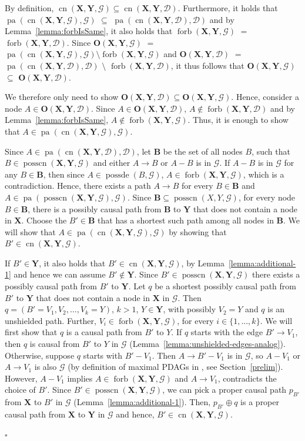 \documentclass[11pt,a4paper]{article}
\theoremstyle{definition}
\theoremstyle{remark}
\newenvironment{proofof}[1][]{\begin{trivlist}
\item[\hskip \labelsep {\textit{Proof of #1.}}]}{\hfill{}$\square$\end{trivlist}}
\DeclareMathOperator{\Forbb}{forb}
\DeclareMathOperator{\pa}{pa}
\DeclareMathOperator{\possde}{possde}
\DeclareMathOperator{\CN}{cn}
\DeclareMathOperator{\possCN}{posscn}
\newcommand{\mpdag}{maximal PDAG}
\newcommand{\g}[1][G]{\mathcal{#1}}
\newcommand{\fb}[2][X,Y]{\Forbb(\mathbf{#1},#2)}
\newcommand{\cnb}[2][X,Y]{\CN(\mathbf{#1},#2)}
\newcommand{\posscn}[2][X,Y]{\possCN(#1,#2)}
\newcommand{\posscnb}[2][X,Y]{\possCN(\mathbf{#1},#2)}
\newcommand{\optb}[2][X,Y]{\mathbf{O}(\mathbf{#1},#2)}
\begin{document}
\begin{proofof}[Lemma~\ref{lemma:optimalSetEquiv}] %
	By definition, $\cnb{\g} \subseteq \cnb{\g[D]}$. Furthermore, it holds that $\pa(\cnb{\g},\g)$ $\subseteq$ $ \pa(\cnb{\g[D]},\g[D])$ and by Lemma~\ref{lemma:forbIsSame}, it also holds that $\fb{\g}$ $=$ $\fb{\g[D]}$. Since $\optb{\g}$ $=$ $\pa(\cnb{\g},\g)\setminus \fb{\g}$ and $\optb{\g[D]}$ $=$ $\pa(\cnb{\g[D]},\g[D])$ $\setminus$ $\fb{\g[D]}$, it thus follows that $\optb{\g}$ $\subseteq$ $\optb{\g[D]}$.
	
	We therefore only need to show $\optb{\g[D]} \subseteq \optb{\g}$. Hence, consider a node $A \in \optb{\g[D]}$. Since $A \in \optb{\g[D]}$, $A \notin \fb{\g[D]}$ and by Lemma~\ref{lemma:forbIsSame}, $A \notin \fb{\g}$. Thus, it is enough to show that $A \in \pa(\cnb{\g},\g)$.
	
	Since $A \in \pa(\cnb{\g[D]},\g[D])$, let $\mathbf{B}$ be the set of all nodes $B $, such that $B \in \posscnb{\g}$ and either $A \rightarrow B$ or $A-B$ is in $\g$. If $A-B$ is in $\g$ for any $B \in \mathbf{B}$, then since $A \in \possde(B,\g)$, $A \in \fb{\g}$, which is a contradiction. Hence, there exists a path $A \rightarrow B$ for every $B \in \mathbf{B}$ and $A \in \pa(\posscnb{\g},\g)$.
	Since $\mathbf{B} \subseteq \posscn{\g}$, for every node $B \in \mathbf{B}$, there is a possibly causal path from $\mathbf{B}$ to $\mathbf{Y}$ that does not contain a node in $\mathbf{X}$. Choose  the $B' \in \mathbf{B}$ that has a shortest such path among all nodes in $\mathbf{B}$. 
	We will show that $A \in \pa(\cnb{\g},\g)$ by showing that $B' \in \cnb{\g}$.
	
	If $B' \in \mathbf{Y}$,  it also holds that $B' \in \cnb{\g}$, by Lemma~\ref{lemma:additional-1} and hence we can assume $B' \notin \mathbf{Y}$. Since $B' \in \posscnb{\g}$ there exists a possibly causal path from $B'$ to $\mathbf{Y}$. Let $q$ be a shortest possibly causal path from $B'$ to $\mathbf{Y}$ that does not contain a node in $\mathbf{X}$ in $\g$. Then $q = ( B' =V_1, V_2,\dots, V_k=Y)$, $k >1$, $Y\in \mathbf{Y}$, with possibly $V_2 =Y$ and $q$ is an unshielded path. Further, $V_i \in \fb{\g}$, for every $i \in \{1,\dots,k\}$. 
	We will first show that $q$ is a causal path from $B'$ to $Y$.
	If $q$ starts with the edge $B' \rightarrow V_1$, then $q$ is causal from $B'$ to $Y$ in $\g$ (Lemma~\ref{lemma:unshielded-edges-analog}).  Otherwise, suppose $q$ starts with $B' - V_1$. Then $A \rightarrow B' -V_1$ is in $\g$, so $A -V_1$ or $A \rightarrow V_1$ is also $\g$ (by definition of \mpdag{}s in \citet{meek1995causal}, see Section~\ref{prelim}).
	However, $A - V_1$ implies $A \in \fb{\g}$ and $A \rightarrow V_1$, contradicts the choice of $B'$. 
	Since $B' \in \posscnb{\g}$, we can pick a proper causal path $p_{B'}$ from $\mathbf{X}$ to $B'$ in $\g$ (Lemma~\ref{lemma:additional-1}). 
Then, $ p_{B'} \oplus q$ is a proper causal path from $\mathbf{X}$ to $\mathbf{Y}$ in $\g$ and hence, $B' \in \cnb{\g}$.
		
\end{proofof}
\end{document}

